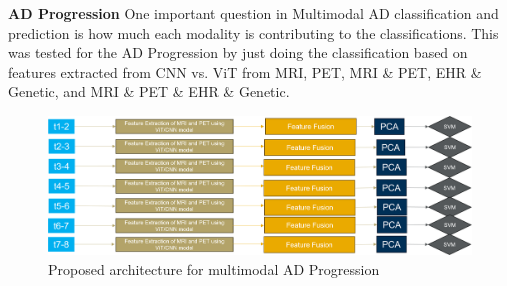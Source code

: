 \textbf{AD Progression}
One important question in Multimodal AD classification and prediction is how much each modality is contributing to the classifications. This was tested for the AD Progression by just doing the classification based on features extracted from CNN vs. ViT from MRI, PET, MRI \& PET, EHR \& Genetic, and MRI \& PET \& EHR \& Genetic.
\begin{figure}
    \centering
    \includegraphics[width=0.8\linewidth]{figs/Picture14.png}
    \caption{Proposed architecture for multimodal AD Progression }
    \label{fig:enter-label}
\end{figure}